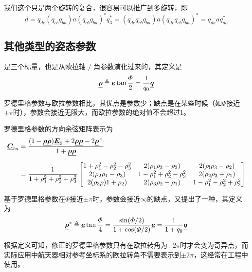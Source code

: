 我们这个只是两个旋转的复合，很容易可以推广到多旋转，即
\begin{equation}
	d = q_{dc}(q_{cb} q_{ba}) a (q_{cb} q_{ba})^*q_3^* = (q_{dc} q_{cb} q_{ba}) a (q_{dc} q_{cb} q_{ba})^* = q_{da} a q_{da}^*
\end{equation}


\subsection{其他类型的姿态参数}


是三个标量，也是从欧拉轴 / 角参数演化过来的，其定义是
\begin{equation}
	\underline{\bm{\rho}} \triangleq \underline{\bm{e}} \tan \dfrac{\varPhi}{2} = \dfrac{1}{q_0} \underline{\bm{q}}
\end{equation}

罗德里格参数与欧拉参数相比，其优点是参数少；缺点是在某些时候（如$\varPhi$接近$\pm \pi$时），参数会接近无限大，而欧拉参数的绝对值不会超过1。

罗德里格参数的方向余弦矩阵表示为
\begin{align}
	\underline{\bm{C}}_{ba} &= 
	\dfrac{(1 - \underline{\bm{\rho}}\underline{\bm{\rho}})\underline{\bm{E}}_3 + 2 \underline{\bm{\rho}} \underline{\bm{\rho}} - 2 \underline{\bm{\rho}}^\times}{1 + \underline{\bm{\rho}}\underline{\bm{\rho}} } \\[0.5em]
	&=
	\dfrac{1}{1 + \rho_1^2 + \rho_2^2 + \rho_3^2 }
	\begin{bmatrix}
		1 + \rho_1^2 - \rho_2^2 - \rho_3^2 & 2(\rho_1\rho_3 - \rho_3) & 2(\rho_!\rho_3 - \rho_2) \\
		2(\rho_2 \rho_1 - \rho_3) & 1 - \rho_1^2 + \rho_2^2 - \rho_3^2 &2(\rho_2 \rho_3 + \rho_1) \\
		2(\rho_3 \rho)1 + \rho_2) & 2(\rho_3\rho_2 - \rho_1) & 1 - \rho_1^2 - \rho_2^2 + \rho_3^2
	\end{bmatrix}
\end{align}
\vspace*{0.5em}


\sssection[修正的罗德里格参数]

基于罗德里格参数在$\varPhi$接近$\pm \pi$时，参数会接近$\infty$的缺点，又提出了一种，其定义为
\begin{equation}
	\underline{\bm{\rho}}^* \triangleq \underline{\bm{e}} \tan \dfrac{\varPhi}{4} = \dfrac{\sin (\varPhi / 2)}{1 + \cos (\varPhi / 2)} \underline{\bm{e}} = \dfrac{1}{1 + q_0} \underline{\bm{q}}
\end{equation}

根据定义可知，修正的罗德里格参数只有在欧拉转角为$\pm 2 \pi$时才会变为奇异点，而实际应用中航天器相对参考坐标系的欧拉转角不需要表示到$\pm 2 \pi$，这经常在工程中使用。



